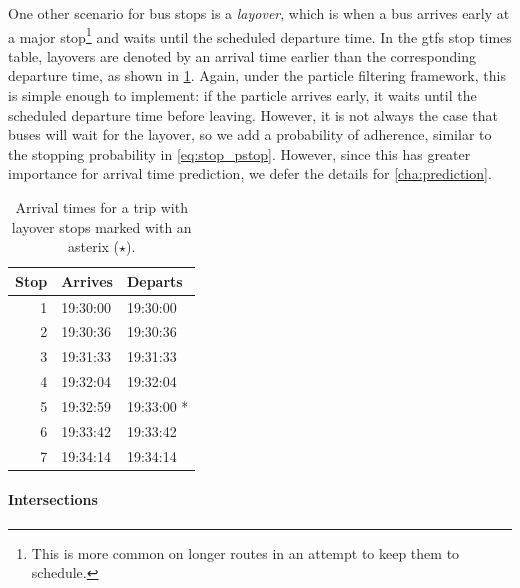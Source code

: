 One other scenario for bus stops is a \emph{layover}, which is when a bus arrives early at a major stop\footnote{This is more common on longer routes in an attempt to keep them to schedule.} and waits until the scheduled departure time. In the \gls{gtfs} stop times table, layovers are denoted by an arrival time earlier than the corresponding departure time, as shown in \cref{tab:layover_times}. Again, under the particle filtering framework, this is simple enough to implement: if the particle arrives early, it waits until the scheduled departure time before leaving. However, it is not always the case that buses will wait for the layover, so we add a probability of adherence, similar to the stopping probability in \cref{eq:stop_pstop}. However, since this has greater importance for arrival time prediction, we defer the details for \cref{cha:prediction}.

\begin{knitrout}\small
{}\color{fgcolor}\begin{table}

\caption{\label{tab:layover_times}Arrival times for a trip with layover stops marked with an asterix ($\star$).}
\centering
\fontsize{8}{10}\selectfont
\begin{tabular}[t]{rll}
\toprule
Stop & Arrives & Departs\\
\midrule
1 & 19:30:00 & 19:30:00\\
2 & 19:30:36 & 19:30:36\\
3 & 19:31:33 & 19:31:33\\
4 & 19:32:04 & 19:32:04\\
5 & 19:32:59 & 19:33:00 *\\
6 & 19:33:42 & 19:33:42\\
7 & 19:34:14 & 19:34:14\\
\bottomrule
\end{tabular}
\end{table}


\end{knitrout}




\paragraph{Intersections}

